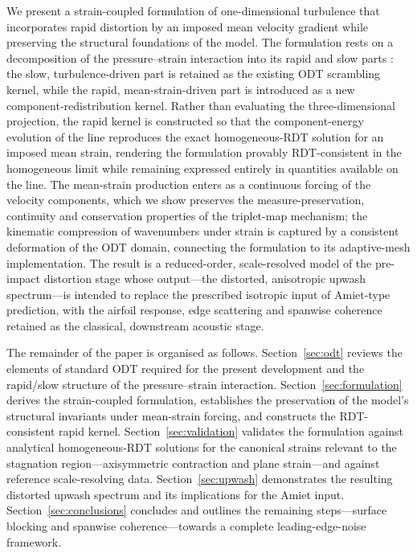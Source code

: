 \documentclass[lineno]{JFM-FLM_Au}
\begin{document}
We present a strain-coupled formulation of one-dimensional turbulence that
incorporates rapid distortion by an imposed mean velocity gradient while
preserving the structural foundations of the model. The formulation rests
on a decomposition of the pressure--strain interaction into its rapid and
slow parts \citep{Pope2000}: the slow, turbulence-driven part is retained
as the existing ODT scrambling kernel, while the rapid, mean-strain-driven
part is introduced as a new component-redistribution kernel. Rather than
evaluating the three-dimensional projection, the rapid kernel is
constructed so that the component-energy evolution of the line reproduces
the exact homogeneous-RDT solution for an imposed mean strain, rendering
the formulation provably RDT-consistent in the homogeneous limit while
remaining expressed entirely in quantities available on the line. The
mean-strain production enters as a continuous forcing of the velocity
components, which we show preserves the measure-preservation, continuity
and conservation properties of the triplet-map mechanism; the kinematic
compression of wavenumbers under strain is captured by a consistent
deformation of the ODT domain, connecting the formulation to its
adaptive-mesh implementation. The result is a reduced-order, scale-resolved
model of the pre-impact distortion stage whose output---the distorted,
anisotropic upwash spectrum---is intended to replace the prescribed
isotropic input of Amiet-type prediction, with the airfoil response, edge
scattering and spanwise coherence retained as the classical, downstream
acoustic stage.

The remainder of the paper is organised as follows.
Section~\ref{sec:odt} reviews the elements of standard ODT required for the
present development and the rapid/slow structure of the pressure--strain
interaction. Section~\ref{sec:formulation} derives the strain-coupled
formulation, establishes the preservation of the model's structural
invariants under mean-strain forcing, and constructs the RDT-consistent
rapid kernel. Section~\ref{sec:validation} validates the formulation
against analytical homogeneous-RDT solutions for the canonical strains
relevant to the stagnation region---axisymmetric contraction and plane
strain---and against reference scale-resolving data. Section~\ref{sec:upwash}
demonstrates the resulting distorted upwash spectrum and its implications
for the Amiet input. Section~\ref{sec:conclusions} concludes and outlines
the remaining steps---surface blocking and spanwise coherence---towards a
complete leading-edge-noise framework.
\end{document}
